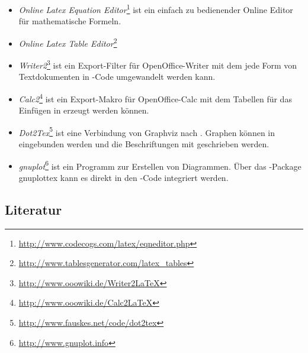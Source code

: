 \begin{itemize}
\item \emph{Online Latex Equation
Editor}\footnote{\url{http://www.codecogs.com/latex/eqneditor.php}} ist ein
einfach zu bedienender Online Editor für mathematische Formeln.
\item \emph{Online Latex Table Editor}\footnote{\url{http://www.tablesgenerator.com/latex_tables}}
\item \emph{Writer2\latex}\footnote{\url{http://www.ooowiki.de/Writer2LaTeX}}
ist ein Export-Filter für OpenOffice-Writer mit dem jede Form von Textdokumenten in
\latex-Code umgewandelt werden kann.
\item \emph{Calc2\latex}\footnote{\url{http://www.ooowiki.de/Calc2LaTeX}} ist
ein Export-Makro für OpenOffice-Calc mit dem Tabellen für das Einfügen in \latex
erzeugt werden können.
\item \emph{Dot2Tex}\footnote{\url{http://www.fauskes.net/code/dot2tex}} ist
eine Verbindung von Graphviz nach \latex. Graphen können in \latex eingebunden werden
und die Beschriftungen mit \latex geschrieben werden.
\item \emph{gnuplot}\footnote{\url{http://www.gnuplot.info}} ist ein Programm
zur Erstellen von Diagrammen. Über das \latex-Package gnuplottex kann es direkt in
den \latex-Code integriert werden.
\end{itemize}


\subsection{Literatur}
\label{sec:literatur}

